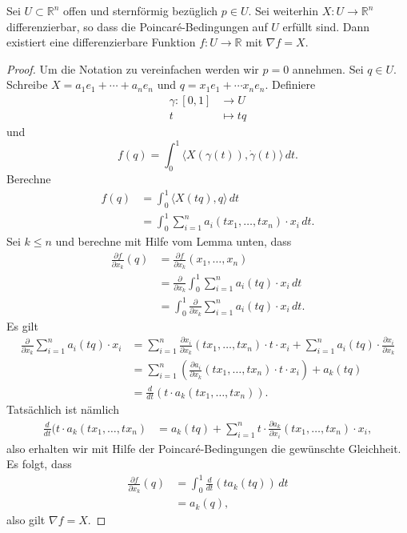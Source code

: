 \documentclass[../main.tex]{subfiles}
\begin{document}
\begin{theorem}
  Sei $U \subset \mathbb{R}^n$ offen und sternförmig bezüglich
  $p \in U$. Sei weiterhin $X \colon U \to \mathbb{R}^n$ 
  differenzierbar, so dass die Poincaré-Bedingungen
  auf $U$ erfüllt sind.
  Dann existiert eine differenzierbare Funktion
  $f \colon U \to \mathbb{R}$ mit $\nabla f = X$.
\end{theorem}

\begin{proof}
  Um die Notation zu vereinfachen werden wir $p = 0$ annehmen.
  Sei $q \in U$.
  Schreibe $X = a_1 e_1 + \cdots + a_n e_n$ und
  $q = x_1 e_1 + \cdots x_n e_n$.
  Definiere
  \begin{align*}
    \gamma \colon [0, 1] & \to U \\
    t & \mapsto tq
  \end{align*}
  und
  \[
    f(q) = \int_{0}^{1} \langle X(\gamma(t)),
    \dot \gamma (t) \rangle \, dt.
  \]
  Berechne
  \begin{align*}
    f(q)
    & = \int_{0}^{1} \langle X(tq), q \rangle \, dt\\
    &= \int_{0}^{1} \sum_{i=1}^{n} a_i(tx_1, \dots, tx_n) \cdot x_i \, dt.
  \end{align*}
  Sei $k \leq n$ und berechne mit Hilfe vom Lemma unten, dass
  \begin{align*}
    \frac{\partial f}{\partial x_k}(q)
    & = \frac{\partial f}{\partial x_k } (x_1, \dots, x_n)\\
    &= \frac{\partial}{\partial x_k} \int_{0}^{1} 
    \sum_{i=1}^{n} a_i (tq) \cdot x_i \, dt \\
    &= \int_{0}^{1} \frac{\partial}{\partial x_k}
    \sum_{i=1}^{n} a_i(tq) \cdot x_i \, dt.
  \end{align*}
  Es gilt
  \begin{align*}
    \frac{\partial}{\partial x_k}
    \sum_{i=1}^{n} a_i(tq) \cdot x_i
    &= \sum_{i=1}^{n} \frac{\partial x_i}{\partial x_k}
    (tx_1, \dots, tx_n) \cdot t \cdot x_i
    + \sum_{i=1}^{n} a_i(tq) \cdot \frac{\partial x_i}{\partial x_k}\\
    &= \sum_{i=1}^{n} \left( \frac{\partial a_i}{\partial x_k}
    (tx_1, \dots, tx_n) \cdot t \cdot x_i \right)
    + a_k(tq) \\
    &= \frac{d}{dt} (t \cdot a_k(tx_1, \dots, tx_n)).
  \end{align*}
  Tatsächlich ist nämlich
  \begin{align*}
    \frac{d}{dt}(t \cdot a_k(tx_1, \dots, tx_n)
    & = a_k(tq) + \sum_{i=1}^{n} t \cdot \frac{\partial a_k}{\partial x_i}
    (tx_1, \dots, tx_n) \cdot x_i,
  \end{align*}
  also erhalten wir mit Hilfe der Poincaré-Bedingungen
  die gewünschte Gleichheit.
  Es folgt, dass
  \begin{align*}
    \frac{\partial f}{\partial x_k}(q)
    & = \int_{0}^{1} \frac{d}{dt}(t a_k (tq)) \, dt\\
    &= a_k(q),
  \end{align*}
  also gilt $\nabla f = X$.
\end{proof}
\end{document}
